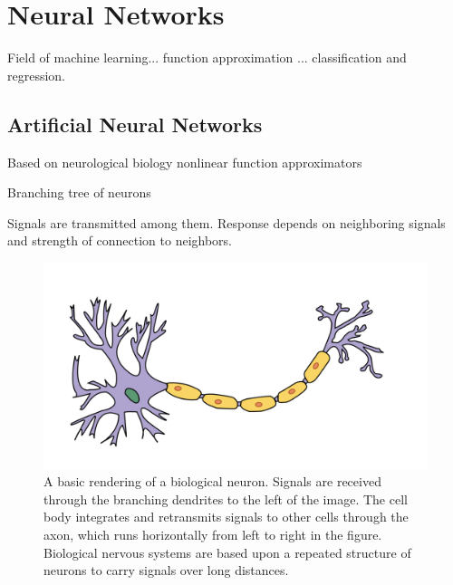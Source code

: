 \chapter{Neural Networks}
\label{nnet_chapter}


Field of machine learning... function approximation ... classification and regression.  


\section{Artificial Neural Networks}


Based on neurological biology nonlinear function approximators 

Branching tree of neurons 

Signals are transmitted among them. Response depends on neighboring signals and strength of connection to neighbors.  

\begin{figure}[t]
  \begin{center}
    \includegraphics[width=\textwidth]{figures/figures/neuron.png}
  \end{center}
  \caption[A basic rendering of a biological neuron]{A basic rendering of a biological neuron.  Signals are received through the branching dendrites to the left of the image.  The cell body integrates and retransmits signals to other cells through the axon, which runs horizontally from left to right in the figure.  Biological nervous systems are based upon a repeated structure of neurons to carry signals over long distances.}

  \label{neuron}
\end{figure}


